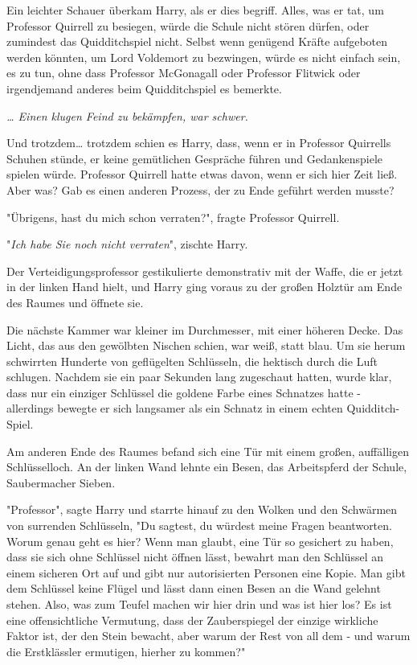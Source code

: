 {Ein leichter Schauer überkam Harry, als er dies begriff. Alles, was er tat, um Professor Quirrell zu besiegen, würde die Schule nicht stören dürfen, oder zumindest das Quidditchspiel nicht. Selbst wenn genügend Kräfte aufgeboten werden könnten, um Lord Voldemort zu bezwingen, würde es nicht einfach sein, es zu tun, ohne dass Professor McGonagall oder Professor Flitwick oder irgendjemand anderes beim Quidditchspiel es bemerkte.

\emph{… Einen klugen Feind zu bekämpfen, war schwer.}

Und trotzdem… trotzdem schien es Harry, dass, wenn er in Professor Quirrells Schuhen stünde, er keine gemütlichen Gespräche führen und Gedankenspiele spielen würde. Professor Quirrell hatte etwas davon, wenn er sich hier Zeit ließ. Aber was? Gab es einen anderen Prozess, der zu Ende geführt werden musste?

"Übrigens, hast du mich schon verraten?", fragte Professor Quirrell.

"\emph{Ich habe Sie noch nicht verraten}", zischte Harry.

Der Verteidigungsprofessor gestikulierte demonstrativ mit der Waffe, die er jetzt in der linken Hand hielt, und Harry ging voraus zu der großen Holztür am Ende des Raumes und öffnete sie.

Die nächste Kammer war kleiner im Durchmesser, mit einer höheren Decke. Das Licht, das aus den gewölbten Nischen schien, war weiß, statt blau. Um sie herum schwirrten Hunderte von geflügelten Schlüsseln, die hektisch durch die Luft schlugen. Nachdem sie ein paar Sekunden lang zugeschaut hatten, wurde klar, dass nur ein einziger Schlüssel die goldene Farbe eines Schnatzes hatte - allerdings bewegte er sich langsamer als ein Schnatz in einem echten Quidditch-Spiel.

Am anderen Ende des Raumes befand sich eine Tür mit einem großen, auffälligen Schlüsselloch. An der linken Wand lehnte ein Besen, das Arbeitspferd der Schule, Saubermacher Sieben.

"Professor", sagte Harry und starrte hinauf zu den Wolken und den Schwärmen von surrenden Schlüsseln, "Du sagtest, du würdest meine Fragen beantworten. Worum genau geht es hier? Wenn man glaubt, eine Tür so gesichert zu haben, dass sie sich ohne Schlüssel nicht öffnen lässt, bewahrt man den Schlüssel an einem sicheren Ort auf und gibt nur autorisierten Personen eine Kopie. Man gibt dem Schlüssel keine Flügel und lässt dann einen Besen an die Wand gelehnt stehen. Also, was zum Teufel machen wir hier drin und was ist hier los? Es ist eine offensichtliche Vermutung, dass der Zauberspiegel der einzige wirkliche Faktor ist, der den Stein bewacht, aber warum der Rest von all dem - und warum die Erstklässler ermutigen, hierher zu kommen?"

}
